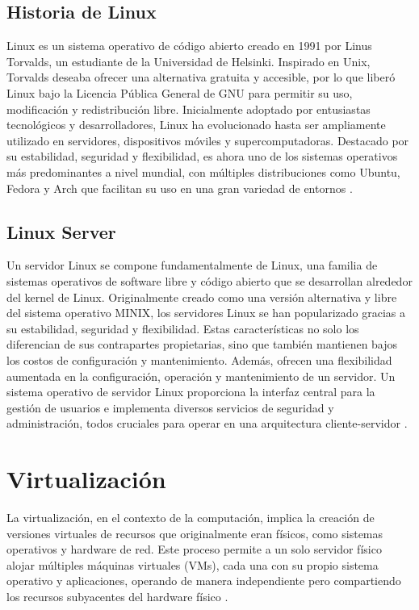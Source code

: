 \subsection{Historia de Linux}
Linux es un sistema operativo de código abierto creado en 1991 por Linus Torvalds, un estudiante de la Universidad de Helsinki. Inspirado en Unix, Torvalds deseaba ofrecer una alternativa gratuita y accesible, por lo que liberó Linux bajo la Licencia Pública General de GNU para permitir su uso, modificación y redistribución libre. Inicialmente adoptado por entusiastas tecnológicos y desarrolladores, Linux ha evolucionado hasta ser ampliamente utilizado en servidores, dispositivos móviles y supercomputadoras. Destacado por su estabilidad, seguridad y flexibilidad, es ahora uno de los sistemas operativos más predominantes a nivel mundial, con múltiples distribuciones como Ubuntu, Fedora y Arch que facilitan su uso en una gran variedad de entornos \cite{HistoriaLinux}.

\subsection{Linux Server}
Un servidor Linux se compone fundamentalmente de Linux, una familia de sistemas operativos de software libre y código abierto que se desarrollan alrededor del kernel de Linux. Originalmente creado como una versión alternativa y libre del sistema operativo MINIX, los servidores Linux se han popularizado gracias a su estabilidad, seguridad y flexibilidad. Estas características no solo los diferencian de sus contrapartes propietarias, sino que también mantienen bajos los costos de configuración y mantenimiento. Además, ofrecen una flexibilidad aumentada en la configuración, operación y mantenimiento de un servidor. Un sistema operativo de servidor Linux proporciona la interfaz central para la gestión de usuarios e implementa diversos servicios de seguridad y administración, todos cruciales para operar en una arquitectura cliente-servidor \cite{LinuxServer}.

\section{Virtualización}
La virtualización, en el contexto de la computación, implica la creación de versiones virtuales de recursos que originalmente eran físicos, como sistemas operativos y hardware de red. Este proceso permite a un solo servidor físico alojar múltiples máquinas virtuales (VMs), cada una con su propio sistema operativo y aplicaciones, operando de manera independiente pero compartiendo los recursos subyacentes del hardware físico \cite{Virtualizacion}.

